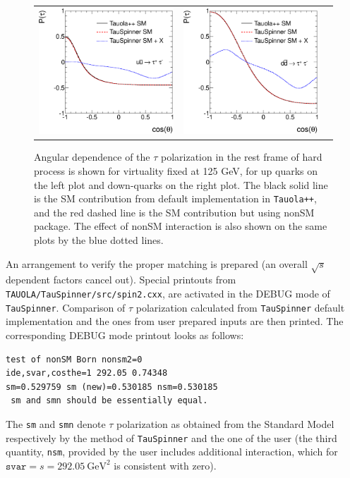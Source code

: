 \documentclass[12pt]{article}
\begin{document}
\begin{figure}[htp!]
\begin{tabular}{ccc}
\includegraphics[width=0.48\columnwidth]{costheta_up_s=125.eps} & 
\includegraphics[width=0.48\columnwidth]{costheta_down_s=125.eps} 
\end{tabular}
\caption{ Angular dependence of the $\tau$ polarization in the rest frame of hard process is shown for virtuality fixed at 125 GeV,
for up quarks on the left plot and down-quarks on the right plot.
The black solid line is the SM contribution from default implementation in {\tt Tauola++}, and the red dashed line is the SM contribution but using nonSM package.
The effect of nonSM interaction is also shown on the same plots by the blue dotted lines.
\label{PolAng}}
\end{figure}

An  arrangement to verify the proper matching is prepared 
(an  overall $\sqrt{s}$ dependent factors cancel out).
Special printouts from
{\tt TAUOLA/TauSpinner/src/spin2.cxx},
are activated in the DEBUG mode of {\tt TauSpinner}.
Comparison of $\tau$ polarization calculated from {\tt TauSpinner} 
default implementation and the ones from user prepared inputs are then printed.
The corresponding DEBUG mode printout looks as follows:
\begin{verbatim}
test of nonSM Born nonsm2=0
ide,svar,costhe=1 292.05 0.74348
sm=0.529759 sm (new)=0.530185 nsm=0.530185
 sm and smn should be essentially equal.
\end{verbatim}
The {\tt sm} and {\tt smn} denote $\tau$ polarization as obtained from the 
Standard Model respectively by the method of {\tt TauSpinner} and the one of the
user (the third quantity,  {\tt nsm}, provided by the user includes additional 
interaction, which for $\texttt{svar}=s=292.05 ~\text{GeV}^2$ is consistent with zero).
\end{document}
